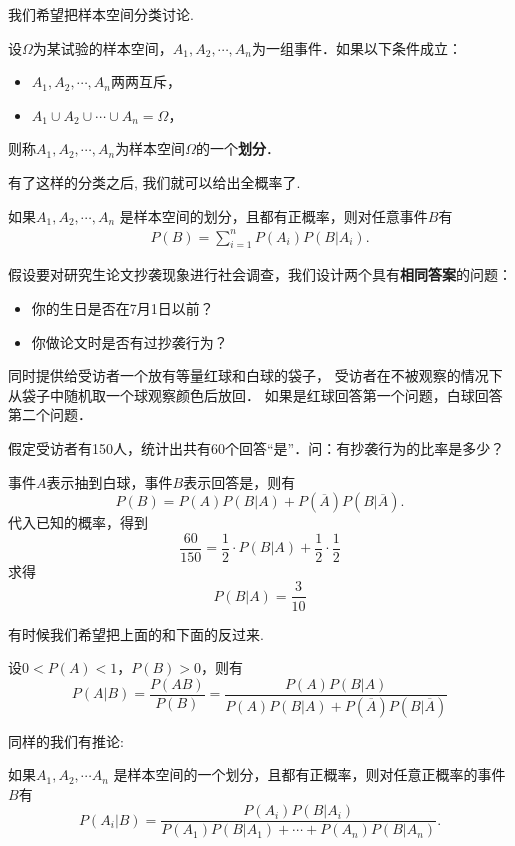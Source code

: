 我们希望把样本空间分类讨论. 

\begin{definition}
    设$\Omega$为某试验的样本空间，$A_1, A_2, \cdots, A_n$为一组事件．如果以下条件成立：
    \begin{itemize}
        \item $A_1, A_2, \cdots, A_n$两两互斥，
        \item $A_1 \cup A_2 \cup \cdots \cup A_n=\Omega$，
    \end{itemize}
    则称$A_1, A_2, \cdots , A_n$为样本空间$\Omega$的一个\textbf{划分}．
\end{definition}

有了这样的分类之后, 我们就可以给出全概率了. 

\begin{theorem}[全概率公式]
    如果$A_1, A_2, \cdots, A_n$ 是样本空间的划分，且都有正概率，则对任意事件$B$有
    \begin{align*}
        P(B)=\sum_{i=1}^n P(A_i) P(B|A_i).
    \end{align*}
\end{theorem}

\begin{example}
    假设要对研究生论文抄袭现象进行社会调查，我们设计两个具有\textbf{相同答案}的问题：
        \begin{itemize}
            \item 你的生日是否在7月1日以前？
            \item 你做论文时是否有过抄袭行为？
        \end{itemize}
        同时提供给受访者一个放有等量红球和白球的袋子，
        受访者在不被观察的情况下从袋子中随机取一个球观察颜色后放回．
        如果是红球回答第一个问题，白球回答第二个问题．

        假定受访者有150人，统计出共有60个回答“是”．问：有抄袭行为的比率是多少？
\end{example}

\begin{solution}
    事件$A$表示抽到白球，事件$B$表示回答是，则有
    $$P(B)=P(A)P(B|A)+P(\overline{A})P(B|\overline{A}).$$
    代入已知的概率，得到
    $$\frac{60}{150}=\frac12\cdot P(B|A)+\frac12\cdot\frac12 $$
    求得
    $$P(B|A)=\frac{3}{10}$$
\end{solution}

有时候我们希望把上面的和下面的反过来. 

\begin{theorem}
    设$0<P(A)<1$，$P(B)>0$，则有
    $$P(A|B)=\frac{P(AB)}{P(B)}
        =\frac{P(A)P(B|A)}{P(A)P(B|A)+P(\overline{A})P(B|\overline{A})}$$
\end{theorem}

同样的我们有推论: 

\begin{corollary}
    如果$A_1, A_2, \cdots A_n$ 是样本空间的一个划分，且都有正概率，则对任意正概率的事件$B$有
    \[
        P(A_i|B)=\frac{P(A_i)P(B|A_i)}{P(A_1)P(B|A_1)+\cdots+P(A_n)P(B|A_n)}.%
    \]
\end{corollary}